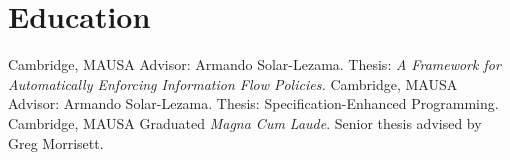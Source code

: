 \section{Education}
  {Cambridge, MA}{USA}
    {Advisor: Armando Solar-Lezama. Thesis: \emph{A Framework for Automatically Enforcing Information Flow Policies.}}
  {Cambridge, MA}{USA}
  {Advisor: Armando Solar-Lezama. Thesis: {Specification-Enhanced Programming.}}
  {Cambridge, MA}{USA}
  {Graduated \emph{Magna Cum Laude}. Senior thesis advised by Greg Morrisett.}
